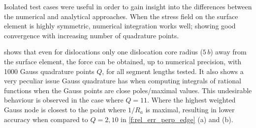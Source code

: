 \documentclass[11pt]{iopart}
\begin{document}
Isolated test cases were useful in order to gain insight into the differences between the numerical and analytical approaches. When the stress field on the surface element is highly symmetric, numerical integration works well; showing good convergence with increasing number of quadrature points.

 shows that even for dislocations only one dislocation core radius ($5\, b$) away from the surface element, the force can be obtained, up to numerical precision, with 1000 Gauss quadrature points $Q$, for all segment lengths tested. It also shows a very peculiar issue Gauss quadrature has when computing integrals of rational functions when the Gauss points are close poles/maximal values. This undesirable behaviour is observed in the case where $Q = 11$. Where the highest weighted Gauss node is closest to the point where $1/R_{a}$ is maximal, resulting in lower accuracy when compared to $Q = 2, 10$ in \cref{f:rel_err_perp_edge} (a) and (b).
\end{document}
